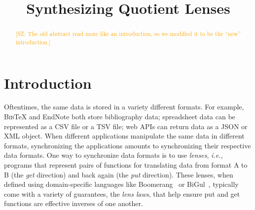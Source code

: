 \documentclass[acmsmall,review,anonymous]{acmart}
\newcommand{\FINISH}[3]{\ifdraft\textcolor{#1}{[#2: #3]}\fi}
\newcommand{\saz}[1]{\FINISH{orange}{SZ}{#1}}
\newcommand{\bibtex}{\textsc{Bib}\TeX{}}
\begin{document}
\title{Synthesizing Quotient Lenses}
\begin{abstract}
\saz{The old abstract read more like an introduction, so we modified it to be
the ``new'' introduction.}
\end{abstract}

\maketitle              %

\section{Introduction}

Oftentimes, the same data is stored in a variety different formats. For
example, \bibtex{} and EndNote both store bibliography data; spreadsheet data
can be represented as a CSV file or a TSV file; web APIs can return data as a
JSON or
XML object. When different applications manipulate the same data in different formats,
synchronizing the applications amounts to synchronizing their respective data
formats. One way to synchronize data formats is to use \emph{lenses}, \emph{i.e.,} programs that represent pairs of functions for translating data from
format A to B (the \emph{get} direction) and back again (the \emph{put}
direction).  These lenses, when defined using domain-specific
languages like Boomerang~\cite{boomerang} or
BiGul~\cite{ko2016bigul}, typically come with a variety of guarantees,
the \emph{lens laws}, that help ensure put and get functions are effective
inverses of one another.
\end{document}
